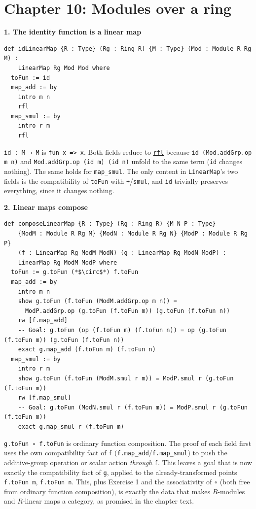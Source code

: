 \section{Chapter 10: Modules over a ring}\label{sec:14-appendix-solutions:09-chapter-10:1}

\textbf{1. The identity function is a linear map}

\begin{lstlisting}
def idLinearMap {R : Type} (Rg : Ring R) {M : Type} (Mod : Module R Rg M) :
    LinearMap Rg Mod Mod where
  toFun := id
  map_add := by
    intro m n
    rfl
  map_smul := by
    intro r m
    rfl
\end{lstlisting}

\texttt{id : M → M} is \texttt{fun x => x}. Both fields reduce to \href{https://lean-lang.org/doc/reference/latest/Tactic-Proofs/Tactic-Reference/}{\texttt{rfl}} because \texttt{id (Mod.addGrp.op m n)} and \texttt{Mod.addGrp.op (id m) (id n)} unfold to the same term (\texttt{id} changes nothing). The same holds for \texttt{map\_\allowbreak{}smul}. The only content in \texttt{LinearMap}'s two fields is the compatibility of \texttt{toFun} with \texttt{+}/\texttt{smul}, and \texttt{id} trivially preserves everything, since it changes nothing.

\textbf{2. Linear maps compose}

\begin{lstlisting}
def composeLinearMap {R : Type} (Rg : Ring R) {M N P : Type}
    {ModM : Module R Rg M} {ModN : Module R Rg N} {ModP : Module R Rg P}
    (f : LinearMap Rg ModM ModN) (g : LinearMap Rg ModN ModP) :
    LinearMap Rg ModM ModP where
  toFun := g.toFun (*$\circ$*) f.toFun
  map_add := by
    intro m n
    show g.toFun (f.toFun (ModM.addGrp.op m n)) =
      ModP.addGrp.op (g.toFun (f.toFun m)) (g.toFun (f.toFun n))
    rw [f.map_add]
    -- Goal: g.toFun (op (f.toFun m) (f.toFun n)) = op (g.toFun (f.toFun m)) (g.toFun (f.toFun n))
    exact g.map_add (f.toFun m) (f.toFun n)
  map_smul := by
    intro r m
    show g.toFun (f.toFun (ModM.smul r m)) = ModP.smul r (g.toFun (f.toFun m))
    rw [f.map_smul]
    -- Goal: g.toFun (ModN.smul r (f.toFun m)) = ModP.smul r (g.toFun (f.toFun m))
    exact g.map_smul r (f.toFun m)
\end{lstlisting}

\texttt{g.toFun ∘ f.toFun} is ordinary function composition. The proof of each field first uses the own compatibility fact of \texttt{f} (\texttt{f.map\_\allowbreak{}add}/\texttt{f.map\_\allowbreak{}smul}) to push the additive-group operation or scalar action \emph{through} \texttt{f}. This leaves a goal that is now exactly the compatibility fact of \texttt{g}, applied to the already-transformed points \texttt{f.toFun m}, \texttt{f.toFun n}. This, plus Exercise 1 and the associativity of \texttt{∘} (both free from ordinary function composition), is exactly the data that makes \(R\)-modules and \(R\)-linear maps a category, as promised in the chapter text.

